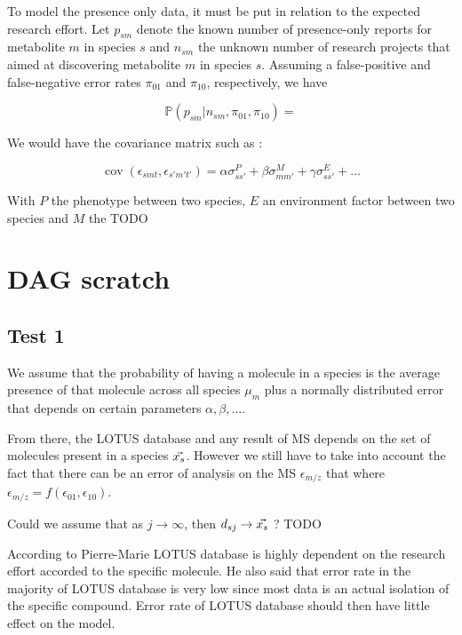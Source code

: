 \documentclass[a4paper,10pt]{article}
\DeclareMathOperator{\cov}{cov}
\def\P{\mathbb{P}}
\begin{document}
	To model the presence only data, it must be put in relation to the expected research effort. Let $p_{sm}$ denote the known number of presence-only reports for metabolite $m$ in species $s$ and $n_{sm}$ the unknown number of research projects that aimed at discovering metabolite $m$ in species $s$. Assuming a false-positive and false-negative error rates $\pi_{01}$ and $\pi_{10}$, respectively, we have
	
	\begin{equation*}
	 \P(p_{sm}|n_{sm}, \pi_{01}, \pi_{10}) = 
	\end{equation*}
	
	
	We would have the covariance matrix such as :
	
	\begin{equation}
		\cov (\epsilon_{smt}, \epsilon_{s'm't'}) = \alpha \sigma_{ss'}^P + \beta \sigma_{mm'}^M + \gamma \sigma_{ss'}^E + \ldots
	\end{equation}
	
	With $P$ the phenotype between two species, $E$ an environment factor between two species and $M$ the TODO 

\section{DAG scratch}
\subsection{Test 1}
We assume that the probability of having a molecule in a species is the average presence of that molecule across all species $\mu_m$ plus a normally distributed error that depends on certain parameters $\alpha, \beta, \ldots$. 

From there, the LOTUS database and any result of MS depends on the set of molecules present in a species $\vec{\boldmath{x_s}}$. However we still have to take into account the fact that there can be an error of analysis on the MS $\epsilon_{m/z}$ that where $\epsilon_{m/z} = f(\epsilon_{01}, \epsilon_{10})$. 

Could we assume that as $j \rightarrow \infty$, then $d_{sj} \rightarrow \vec{\boldmath{x_s}}$ ?  TODO

According to Pierre-Marie LOTUS database is highly dependent on the research effort accorded to the specific molecule. He also said that error rate in the majority of LOTUS database is very low since most data is an actual isolation of the specific compound. Error rate of LOTUS database should then have little effect on the model. \\
\end{document}
